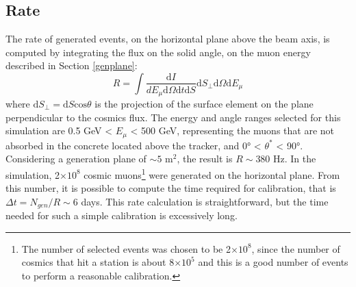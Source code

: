 \subsection{Rate}\label{ratetracker}
The rate of generated events, on the horizontal plane above the beam axis, is computed by integrating the flux on the solid angle, on the muon energy described in Section \ref{genplane}:
\begin{equation}
   R= \int \frac{\text{d} I}{d E_\mu \text{d} \Omega \text{d} t \text{d} S} \text{d} S_{\perp} \text{d} \Omega \text{d} E_\mu
    \end{equation}
where $\text{d}S_\perp= \text{d}S \text{cos}\theta$ is the projection of the surface element on the plane perpendicular to the cosmics flux. 
The energy and angle ranges selected for this simulation are 0.5 GeV < $E_\mu$ < 500 GeV, representing the 
muons that are not absorbed in the concrete located above the tracker, and 0° < $\theta^*$ < 90°. 
Considering a generation plane of $\sim 5$ m$^2$, the result is $R \sim 380$ Hz. 
In the simulation, 2$\times 10^8$ cosmic muons\footnote{The number of selected events was chosen to be 2$\times 10^8$, since the number of cosmics that 
hit a station is about 8$\times 10^5$ and this is a good number of events to perform a reasonable calibration.} were generated on the horizontal plane. 
From this number, it is possible to compute the time required for calibration, that is
$\Delta t = N_{gen}/R\sim 6$ days. 
This rate calculation is straightforward, but the time needed for such a simple calibration is excessively long.
